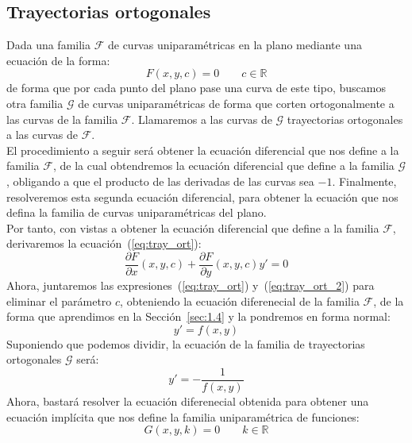 \subsection{Trayectorias ortogonales}
Dada una familia $\mathcal{F}$ de curvas uniparamétricas en la plano mediante una ecuación de la forma:
\begin{equation}\label{eq:tray_ort}
    F(x,y,c) = 0 \qquad c\in \mathbb{R}
\end{equation}
de forma que por cada punto del plano pase una curva de este tipo, buscamos otra familia $\mathcal{G}$ de curvas uniparamétricas de forma que corten ortogonalmente a las curvas de la familia $\mathcal{F}$. Llamaremos a las curvas de $\mathcal{G}$ trayectorias ortogonales a las curvas de $\mathcal{F}$.\\

El procedimiento a seguir será obtener la ecuación diferencial que nos define a la familia $\mathcal{F}$, de la cual obtendremos la ecuación diferencial que define a la familia $\mathcal{G}$, obligando a que el producto de las derivadas de las curvas sea $-1$. Finalmente, resolveremos esta segunda ecuación diferencial, para obtener la ecuación que nos defina la familia de curvas uniparamétricas del plano.\\

Por tanto, con vistas a obtener la ecuación diferencial que define a la familia $\mathcal{F}$, derivaremos la ecuación~(\ref{eq:tray_ort}):
\begin{equation}\label{eq:tray_ort_2}
    \dfrac{\partial F}{\partial x}(x,y,c) + \dfrac{\partial F}{\partial y}(x,y,c)y' = 0
\end{equation}
Ahora, juntaremos las expresiones~(\ref{eq:tray_ort}) y~(\ref{eq:tray_ort_2}) para eliminar el parámetro $c$, obteniendo la ecuación diferenecial de la familia $\mathcal{F}$, de la forma que aprendimos en la Sección~\ref{sec:1.4} y la pondremos en forma normal:
\begin{equation*}
    y' = f(x,y)
\end{equation*}
Suponiendo que podemos dividir, la ecuación de la familia de trayectorias ortogonales $\mathcal{G}$ será:
\begin{equation*}
    y' = -\dfrac{1}{f(x,y)}
\end{equation*}
Ahora, bastará resolver la ecuación diferenecial obtenida para obtener una ecuación implícita que nos define la familia uniparamétrica de funciones:
\begin{equation*}
    G(x,y,k) = 0 \qquad k\in \mathbb{R}
\end{equation*}

